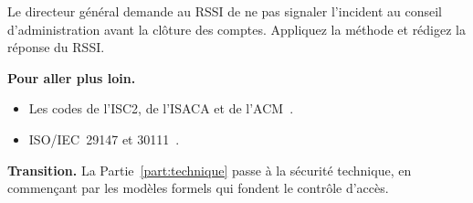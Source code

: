 \begin{boxexo}[title={\ding{45}\quad Exercice~12.10. Le dilemme du RSSI \niveauexpert}]
Le directeur général demande au RSSI de ne pas signaler l'incident au
conseil d'administration avant la clôture des comptes. Appliquez la
méthode et rédigez la réponse du RSSI.
\end{boxexo}

\bigskip

\begin{boxinfo}
\textbf{Pour aller plus loin.}
\begin{itemize}
    \item Les codes de l'ISC2, de l'ISACA et de
          l'ACM~\cite{isc2ethics,isaca2024ethique,acm2018code}.
    \item ISO/IEC~29147 et 30111~\cite{iso29147_2018,iso30111_2019}.
\end{itemize}
\end{boxinfo}

\begin{boxinfo}
\textbf{Transition.} La Partie~\ref{part:technique} passe à la sécurité
technique, en commençant par les modèles formels qui fondent le contrôle
d'accès.
\end{boxinfo}
